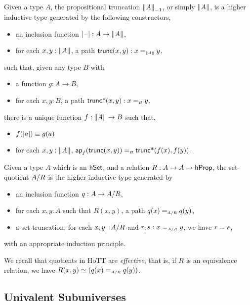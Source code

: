 \begin{definition}
  Given a type $A$, the propositional truncation $\Trunc[-1]{A}$, or simply $\Trunc{A}$, is a higher inductive type
  generated by the following constructors,
  \begin{itemize}
    \item an inclusion function $\trunc{\blank} : A \to \Trunc{A}$,
    \item for each $x, y : \Trunc{A}$, a path $\term{trunc}(x,y) : x \id_{\Trunc{A}} y$,
  \end{itemize}
  such that, given any type $B$ with
  \begin{itemize}
    \item a function $g : A \to B$,
    \item for each $x, y : B$, a path $\term{trunc*}(x,y) : x \id_{B} y$,
  \end{itemize}
  there is a unique function $f : \Trunc{A} \to B$ such that,
  \begin{itemize}
    \item $f(\vert a\vert) \equiv g(a)$
    \item for each $x, y : \Trunc{A}$, $\ap{f}{\term{trunc}(x,y)} \id_{B} \term{trunc*}(f(x),f(y))$.
  \end{itemize}
\end{definition}

\begin{definition}
  Given a type $A$ which is an $\mathsf{hSet}$, and a relation $R : A \to A \to \mathsf{hProp}$, the set-quotient ${A}/{R}$ is the
  higher inductive type generated by
  \begin{itemize}
    \item an inclusion function $q : A \to {A}/{R}$,
    \item for each $x, y : A$ such that $R(x,y)$, a path $q(x) \id_{\quot{A}{R}} q(y)$,
    \item a set truncation, for each $x, y : {A}/{R}$ and $r, s : x \id_{\quot{A}{R}} y$, we have $r \id s$,
  \end{itemize}
  with an appropriate induction principle.
\end{definition}

We recall that quotients in HoTT are \emph{effective}, that is, if $R$ is an equivalence relation, we have
$R(x,y) \eqv (q(x) \id_{\quot{A}{R}} q(y))$.

\subsection{Univalent Subuniverses}

